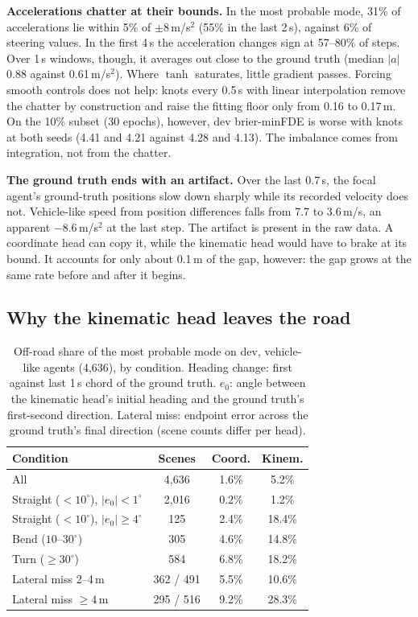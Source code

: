 \documentclass[conference]{IEEEtran}
\begin{document}
\textbf{Accelerations chatter at their bounds.} In the most probable mode, 31\% of accelerations lie
within 5\% of $\pm 8$\,m/s$^2$ (55\% in the last 2\,s), against 6\% of steering values. In the first
4\,s the acceleration changes sign at 57--80\% of steps. Over 1\,s windows, though, it averages out
close to the ground truth (median $|a|$ 0.88 against 0.61\,m/s$^2$). Where $\tanh$ saturates, little
gradient passes. Forcing smooth controls does not help: knots every 0.5\,s with linear
interpolation remove the chatter by construction and raise the fitting floor only from 0.16 to
0.17\,m. On the 10\% subset (30 epochs), however, dev brier-minFDE is worse with knots at both
seeds (4.41 and 4.21 against 4.28 and 4.13). The imbalance comes from integration, not from the
chatter.

\textbf{The ground truth ends with an artifact.} Over the last 0.7\,s, the focal agent's ground-truth
positions slow down sharply while its recorded velocity does not. Vehicle-like speed from position
differences falls from 7.7 to 3.6\,m/s, an apparent $-8.6$\,m/s$^2$ at the last step. The artifact is
present in the raw data. A coordinate head can copy it, while the kinematic head would have to
brake at its bound. It accounts for only about 0.1\,m of the gap, however: the gap grows at the same
rate before and after it begins.

\subsection{Why the kinematic head leaves the road}

\begin{table}[t]
\centering
\caption{Off-road share of the most probable mode on dev, vehicle-like agents (4,636), by
condition. Heading change: first against last 1\,s chord of the ground truth. $e_0$: angle between
the kinematic head's initial heading and the ground truth's first-second direction. Lateral miss:
endpoint error across the ground truth's final direction (scene counts differ per head).}
\label{tab:offroad}
\setlength{\tabcolsep}{4pt}
\begin{tabular}{lccc}
\toprule
Condition & Scenes & Coord. & Kinem. \\
\midrule
All & 4,636 & 1.6\% & 5.2\% \\
Straight ($<10^\circ$), $|e_0| < 1^\circ$ & 2,016 & 0.2\% & 1.2\% \\
Straight ($<10^\circ$), $|e_0| \ge 4^\circ$ & 125 & 2.4\% & 18.4\% \\
Bend ($10$--$30^\circ$) & 305 & 4.6\% & 14.8\% \\
Turn ($\ge 30^\circ$) & 584 & 6.8\% & 18.2\% \\
Lateral miss 2--4\,m & 362 / 491 & 5.5\% & 10.6\% \\
Lateral miss $\ge 4$\,m & 295 / 516 & 9.2\% & 28.3\% \\
\bottomrule
\end{tabular}
\end{table}
\end{document}
